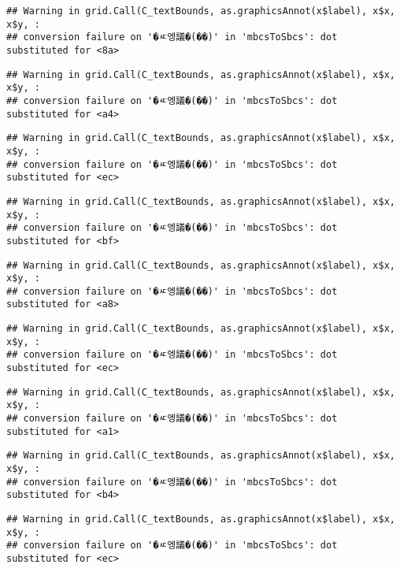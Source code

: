 \documentclass[
]{article}
\begin{document}
\begin{verbatim}
## Warning in grid.Call(C_textBounds, as.graphicsAnnot(x$label), x$x, x$y, :
## conversion failure on '�ㅼ엥議�(��)' in 'mbcsToSbcs': dot substituted for <8a>
\end{verbatim}

\begin{verbatim}
## Warning in grid.Call(C_textBounds, as.graphicsAnnot(x$label), x$x, x$y, :
## conversion failure on '�ㅼ엥議�(��)' in 'mbcsToSbcs': dot substituted for <a4>
\end{verbatim}

\begin{verbatim}
## Warning in grid.Call(C_textBounds, as.graphicsAnnot(x$label), x$x, x$y, :
## conversion failure on '�ㅼ엥議�(��)' in 'mbcsToSbcs': dot substituted for <ec>
\end{verbatim}

\begin{verbatim}
## Warning in grid.Call(C_textBounds, as.graphicsAnnot(x$label), x$x, x$y, :
## conversion failure on '�ㅼ엥議�(��)' in 'mbcsToSbcs': dot substituted for <bf>
\end{verbatim}

\begin{verbatim}
## Warning in grid.Call(C_textBounds, as.graphicsAnnot(x$label), x$x, x$y, :
## conversion failure on '�ㅼ엥議�(��)' in 'mbcsToSbcs': dot substituted for <a8>
\end{verbatim}

\begin{verbatim}
## Warning in grid.Call(C_textBounds, as.graphicsAnnot(x$label), x$x, x$y, :
## conversion failure on '�ㅼ엥議�(��)' in 'mbcsToSbcs': dot substituted for <ec>
\end{verbatim}

\begin{verbatim}
## Warning in grid.Call(C_textBounds, as.graphicsAnnot(x$label), x$x, x$y, :
## conversion failure on '�ㅼ엥議�(��)' in 'mbcsToSbcs': dot substituted for <a1>
\end{verbatim}

\begin{verbatim}
## Warning in grid.Call(C_textBounds, as.graphicsAnnot(x$label), x$x, x$y, :
## conversion failure on '�ㅼ엥議�(��)' in 'mbcsToSbcs': dot substituted for <b4>
\end{verbatim}

\begin{verbatim}
## Warning in grid.Call(C_textBounds, as.graphicsAnnot(x$label), x$x, x$y, :
## conversion failure on '�ㅼ엥議�(��)' in 'mbcsToSbcs': dot substituted for <ec>
\end{verbatim}
\end{document}
